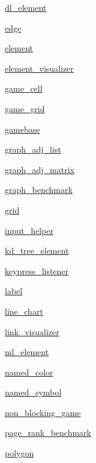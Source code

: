 \begin{DoxyCompactItemize}
\item 
 \hyperlink{namespacebridges_1_1dl__element}{dl\+\_\+element}
\item 
 \hyperlink{namespacebridges_1_1edge}{edge}
\item 
 \hyperlink{namespacebridges_1_1element}{element}
\item 
 \hyperlink{namespacebridges_1_1element__visualizer}{element\+\_\+visualizer}
\item 
 \hyperlink{namespacebridges_1_1game__cell}{game\+\_\+cell}
\item 
 \hyperlink{namespacebridges_1_1game__grid}{game\+\_\+grid}
\item 
 \hyperlink{namespacebridges_1_1gamebase}{gamebase}
\item 
 \hyperlink{namespacebridges_1_1graph__adj__list}{graph\+\_\+adj\+\_\+list}
\item 
 \hyperlink{namespacebridges_1_1graph__adj__matrix}{graph\+\_\+adj\+\_\+matrix}
\item 
 \hyperlink{namespacebridges_1_1graph__benchmark}{graph\+\_\+benchmark}
\item 
 \hyperlink{namespacebridges_1_1grid}{grid}
\item 
 \hyperlink{namespacebridges_1_1input__helper}{input\+\_\+helper}
\item 
 \hyperlink{namespacebridges_1_1kd__tree__element}{kd\+\_\+tree\+\_\+element}
\item 
 \hyperlink{namespacebridges_1_1keypress__listener}{keypress\+\_\+listener}
\item 
 \hyperlink{namespacebridges_1_1label}{label}
\item 
 \hyperlink{namespacebridges_1_1line__chart}{line\+\_\+chart}
\item 
 \hyperlink{namespacebridges_1_1link__visualizer}{link\+\_\+visualizer}
\item 
 \hyperlink{namespacebridges_1_1ml__element}{ml\+\_\+element}
\item 
 \hyperlink{namespacebridges_1_1named__color}{named\+\_\+color}
\item 
 \hyperlink{namespacebridges_1_1named__symbol}{named\+\_\+symbol}
\item 
 \hyperlink{namespacebridges_1_1non__blocking__game}{non\+\_\+blocking\+\_\+game}
\item 
 \hyperlink{namespacebridges_1_1page__rank__benchmark}{page\+\_\+rank\+\_\+benchmark}
\item 
 \hyperlink{namespacebridges_1_1polygon}{polygon}
\item 

\end{DoxyCompactItemize}
